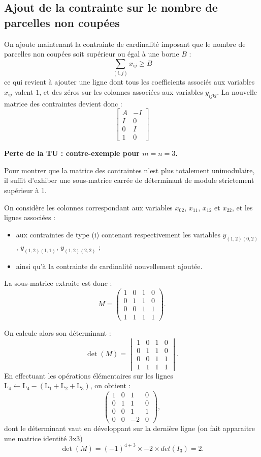 \documentclass[a4paper,11pt]{article}
\begin{document}
\subsection{Ajout de la contrainte sur le nombre de parcelles non coupées}

On ajoute maintenant la contrainte de cardinalité imposant que le nombre de parcelles non coupées soit supérieur ou égal à une borne $B$ :
\[
\sum_{(i,j)}  x_{ij} \ge B
\]
ce qui revient à ajouter une ligne dont tous les coefficients associés aux variables $x_{ij}$ valent $1$, et des zéros sur les colonnes associées aux variables $y_{ijkl}$.
La nouvelle matrice des contraintes devient donc :
\[
\begin{bmatrix}
A & -I \\
I   & 0 \\
0   & I \\
1 & 0
\end{bmatrix}
\]

\vspace{0.5cm}
\noindent
\textbf{Perte de la TU : contre-exemple pour $m=n=3$.}

\noindent
Pour montrer que la matrice des contraintes n’est plus totalement unimodulaire, il suffit d’exhiber une sous-matrice carrée de déterminant de module strictement supérieur à 1.

On considère les colonnes correspondant aux variables $x_{02}$, $x_{11}$, $x_{12}$ et $x_{22}$, et les lignes associées :
\begin{itemize}
    \item aux contraintes de type (i) contenant respectivement les variables 
    $y_{(1,2)(0,2)}$, $y_{(1,2)(1,1)}$, $y_{(1,2)(2,2)}$ ;
    \item ainsi qu’à la contrainte de cardinalité nouvellement ajoutée.
\end{itemize}

La sous-matrice extraite est donc :
\[
M =
\begin{pmatrix}
1 & 0 & 1 & 0 \\[3pt]
0 & 1 & 1 & 0 \\[3pt]
0 & 0 & 1 & 1 \\[3pt]
1 & 1 & 1 & 1
\end{pmatrix}.
\]

On calcule alors son déterminant :
\[
\det(M)
= 
\begin{vmatrix}
1 & 0 & 1 & 0 \\
0 & 1 & 1 & 0 \\
0 & 0 & 1 & 1 \\
1 & 1 & 1 & 1
\end{vmatrix}.
\]
En effectuant les opérations élémentaires sur les lignes 
$\text{L}_4 \leftarrow \text{L}_4 - (\text{L}_1 + \text{L}_2 + \text{L}_3)$,
on obtient :
\[
\begin{pmatrix}
1 & 0 & 1 & 0 \\
0 & 1 & 1 & 0 \\
0 & 0 & 1 & 1 \\
0 & 0 & -2 & 0
\end{pmatrix},
\]
dont le déterminant vaut en développant sur la dernière ligne (on fait apparaitre une matrice identité 3x3)
\[
\det(M) = (-1)^{4+3} \times -2 \times det(I_3)= 2.
\]
\end{document}
